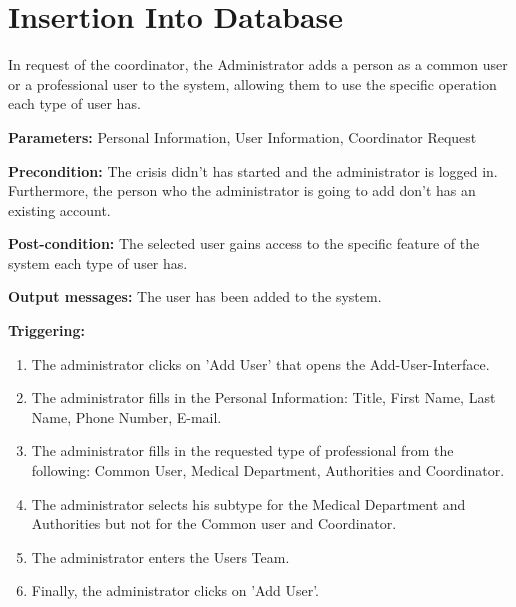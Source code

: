 \section{Insertion Into Database}
\label{operation:AddUser}
In request of the coordinator, the Administrator adds a person as a common user or a professional user 
to the system, allowing them to use the specific operation each type of user has.\\
\begin{description}
\item \textbf{Parameters:} Personal Information, User Information, Coordinator Request
\item \textbf{Precondition:} The crisis didn't has started and the administrator
is logged in. Furthermore, the person who the administrator is going to add
don't has an existing account.
\item \textbf{Post-condition:} The selected user gains access to the specific feature of the system each type of user has.
\item \textbf{Output messages:} The user has been added to the system.
\item \textbf{Triggering:}
\begin{enumerate}
\item The administrator clicks on 'Add User' that opens the Add-User-Interface.
\item The administrator fills in the Personal Information: Title, First Name, Last Name, Phone Number, E-mail.
\item The administrator fills in the requested type of professional from the following: Common User, Medical Department, Authorities and Coordinator.
\item The administrator selects his subtype for the Medical Department and Authorities but not for the Common user and Coordinator.
\item The administrator enters the Users Team.
\item Finally, the administrator clicks on 'Add User'.
\end{enumerate}
\end{description}

